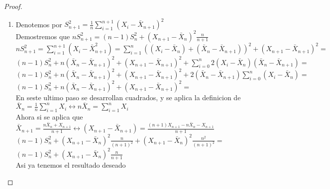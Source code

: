 \begin{proof}
\begin{enumerate}
		\item Denotemos por $S_{n+1}^{2}=\frac{1}{n} \sum_{i=1}^{n+1}\left(X_{i}-\bar{X}_{n+1}\right)^{2}$\\
		      Demostremos que $n S_{n+1}^{2}=(n-1) S_{n}^{2}+\left(X_{n+1}-\bar{X}_{n}\right)^{2} \frac{n}{n+1}$\\
		      $n S_{n+1}^{2}=\sum_{i=1}^{n+1}\left(X_{i}-\bar{X}_{n+1}^{2}\right)=\sum_{i=1}^{n}\left(\left(X_{i}-\bar{X}_{n}\right)+\left(\bar{X}_{n}-\bar{X}_{n+1}\right)\right)^{2}+\left(X_{n+1}-\bar{X}_{n+1}\right)^{2}=$\\
		      $(n-1) S_{n}^{2}+n\left(\bar{X}_{n}-\bar{X}_{n+1}\right)^{2}+\left(X_{n+1}-\bar{X}_{n+1}\right)^{2} + \sum_{i=0}^{n}2\left(X_{i}-\bar{X}_{n}\right)\left(\bar{X}_{n}-\bar{X}_{n+1}\right)=$\\
		      $(n-1) S_{n}^{2}+n\left(\bar{X}_{n}-\bar{X}_{n+1}\right)^{2}+\left(X_{n+1}-\bar{X}_{n+1}\right)^{2} + 2\left(\bar{X}_{n}-\bar{X}_{n+1}\right)\sum_{i=0}^{n}\left(X_{i}-\bar{X}_{n}\right)=$\\
		      $(n-1) S_{n}^{2}+n\left(\bar{X}_{n}-\bar{X}_{n+1}\right)^{2}+\left(X_{n+1}-\bar{X}_{n+1}\right)^{2}=$\\
		      En seste ultimo paso se desarrollan cuadrados, y se aplica la definicion de $\bar{X}_{n} = \frac{1}{n} \sum_{i=1}^{n} X_{i} \leftrightarrow n \bar{X}_{n} = \sum_{i=1}^{n} X_{i}$\\
		      Ahora si se aplica que $\bar{X}_{n+1}=\frac{n \bar{X}_{n}+X_{n+1}}{n+1} \leftrightarrow \left(X_{n+1}-\bar{X}_{n+1}\right) = \frac{(n+1)X_{n+1}-n\bar{X}_{n}-X_{n+1}}{n+1}$\\
		      $(n-1) S_{n}^{2}+\left(X_{n+1}-\bar{X}_{n}\right)^{2} \frac{n}{(n+1)^2}+\left(X_{n+1}-\bar{X}_{n}\right)^{2} \frac{n^2}{(n+1)^2}=$\\
		      $(n-1) S_{n}^{2}+\left(X_{n+1}-\bar{X}_{n}\right)^{2} \frac{n}{n+1}$\\
		      Asi ya tenemos el resultado deseado


\end{enumerate}
\end{proof}
